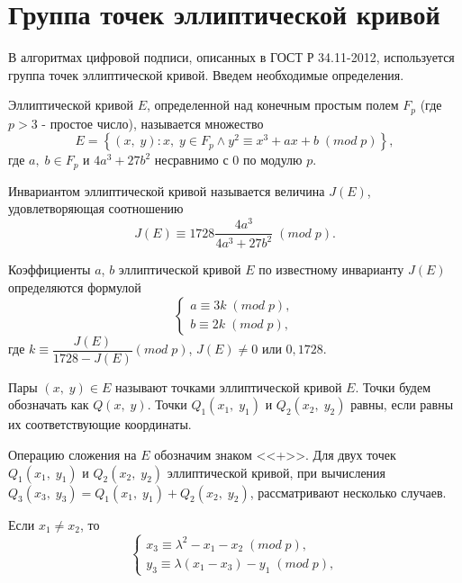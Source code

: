 \section{Группа точек эллиптической кривой}
\par
В алгоритмах цифровой подписи, описанных в ГОСТ Р 34.11-2012, используется группа точек эллиптической кривой. Введем необходимые определения.
\par
Эллиптической кривой $E$, определенной над конечным простым полем $F_p$ (где $p > 3$ - простое число), называется множество
\begin{equation}\label{eq:E}
E = \left\{ (x,\;y)\colon x,\;y\in F_p \land y^2 \equiv x^3 + ax + b\;(mod\; p) \right\},
\end{equation}
где $a,\;b \in F_p$ и $4a^3 + 27b^2$ несравнимо с $0$ по модулю $p$.
\par
Инвариантом эллиптической кривой называется величина $J(E)$, удовлетворяющая соотношению
\begin{equation*}
J(E) \equiv 1728 \frac{4a^3}{4a^3+27b^2}\;(mod\;p).
\end{equation*}
\par
Коэффициенты $a$, $b$ эллиптической кривой $E$ по известному инварианту $J(E)$ определяются формулой
\begin{equation*}
\begin{cases}
a \equiv 3k\;(mod\;p),\\
b \equiv 2k\;(mod\;p),
\end{cases}
\end{equation*}
где $k \equiv \dfrac{J(E)}{1728 - J(E)}(mod\;p)$, $J(E) \neq 0$ или $0,1728$.
\\
\par 
Пары $(x,\;y) \in E$ называют точками эллиптической кривой $E$. Точки будем обозначать как $Q(x,\;y)$. Точки $Q_1(x_1,\;y_1)$ и $Q_2(x_2,\;y_2)$ равны, если равны их соответствующие координаты.
\par
Операцию сложения на $E$ обозначим знаком <<+>>. Для двух точек $Q_1(x_1,\;y_1)$ и $Q_2(x_2,\;y_2)$ эллиптической кривой, при вычисления $Q_3(x_3,\;y_3) = Q_1(x_1,\;y_1) + Q_2(x_2,\;y_2)$, рассматривают несколько случаев.
\par
Если $x_1 \neq x_2$, то
\begin{equation}
\begin{cases}
x_3 \equiv \lambda^2 - x_1 - x_2\;(mod\;p),\\
y_3 \equiv \lambda(x_1-x_3) - y_1\;(mod\;p),
\end{cases}
\end{equation}
